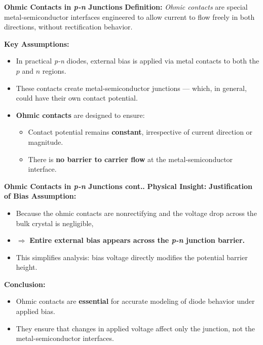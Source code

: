 \begin{frame}{\textbf{Ohmic Contacts in \textit{p-n} Junctions}}
    \textbf{Definition:} \textit{Ohmic contacts} are special metal-semiconductor interfaces engineered to allow current to flow freely in both directions, without rectification behavior.

    \vspace{1em}
    \textbf{Key Assumptions:}
    \begin{itemize}
        \item In practical \textit{p-n} diodes, external bias is applied via metal contacts to both the $p$ and $n$ regions.
        \item These contacts create metal-semiconductor junctions — which, in general, could have their own contact potential.
        \item \textbf{Ohmic contacts} are designed to ensure:
        \begin{itemize}
            \item Contact potential remains \textbf{constant}, irrespective of current direction or magnitude.
            \item There is \textbf{no barrier to carrier flow} at the metal-semiconductor interface.
        \end{itemize}
    \end{itemize}
\end{frame}

\begin{frame}{\textbf{Ohmic Contacts in \textit{p-n} Junctions cont..}}
\textbf{Physical Insight:}
\textbf{Justification of Bias Assumption:}
\begin{itemize}
	\item Because the ohmic contacts are nonrectifying and the voltage drop across the bulk crystal is negligible,
	\item $\Rightarrow$ \textbf{Entire external bias appears across the \textit{p-n} junction barrier.}
	\item This simplifies analysis: bias voltage directly modifies the potential barrier height.
\end{itemize}
\textbf{Conclusion:}
\begin{itemize}
	\item Ohmic contacts are \textbf{essential} for accurate modeling of diode behavior under applied bias.
	\item They ensure that changes in applied voltage affect only the junction, not the metal-semiconductor interfaces.
\end{itemize}
\end{frame}


